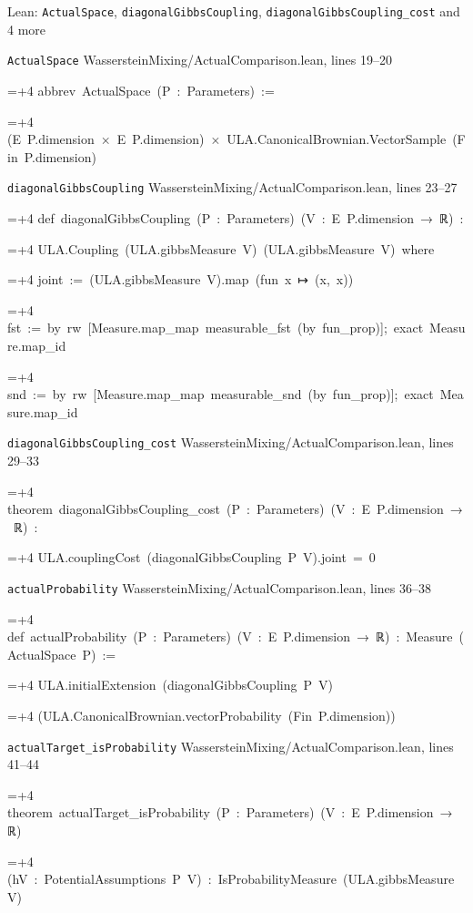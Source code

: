 \documentclass[11pt,a4paper]{report}
\newlength{\leancharwidth}
\newenvironment{leancode}{\par\smallskip\begingroup\ttfamily\footnotesize\raggedright
  \settowidth{\leancharwidth}{M}\setlength{\parskip}{0pt}\setlength{\parindent}{0pt}
  \frenchspacing}{\par\endgroup\smallskip}
\newcommand{\leanline}[2]{\hangindent=\dimexpr#1\leancharwidth+4\leancharwidth\relax
  \hangafter=1\noindent\hspace*{#1\leancharwidth}#2\par}
\newcommand{\leansource}[1]{\par{\footnotesize\color{leanmuted}#1}\par}
\begin{document}
\begin{leanbox}{Lean: \texttt{ActualSpace}, \texttt{diagonalGibbsCoupling}, \texttt{diagonalGibbsCoupling\_\allowbreak{}cost} and 4 more}
\leansource{\texttt{ActualSpace} \quad WassersteinMixing/\allowbreak{}ActualComparison.lean, lines 19–20}
\begin{leancode}
\leanline{0}{abbrev\ ActualSpace\ (P\ :\ Parameters)\ :=}
\leanline{2}{(E\ P.dimension\ ×\ E\ P.dimension)\ ×\ ULA.CanonicalBrownian.VectorSample\ (Fin\ P.dimension)}
\end{leancode}
\leansource{\texttt{diagonalGibbsCoupling} \quad WassersteinMixing/\allowbreak{}ActualComparison.lean, lines 23–27}
\begin{leancode}
\leanline{0}{def\ diagonalGibbsCoupling\ (P\ :\ Parameters)\ (V\ :\ E\ P.dimension\ →\ ℝ)\ :}
\leanline{4}{ULA.Coupling\ (ULA.gibbsMeasure\ V)\ (ULA.gibbsMeasure\ V)\ where}
\leanline{2}{joint\ :=\ (ULA.gibbsMeasure\ V).map\ (fun\ x\ ↦\ (x,\ x))}
\leanline{2}{fst\ :=\ by\ rw\ [Measure.map\_map\ measurable\_fst\ (by\ fun\_prop)];\ exact\ Measure.map\_id}
\leanline{2}{snd\ :=\ by\ rw\ [Measure.map\_map\ measurable\_snd\ (by\ fun\_prop)];\ exact\ Measure.map\_id}
\end{leancode}
\leansource{\texttt{diagonalGibbsCoupling\_\allowbreak{}cost} \quad WassersteinMixing/\allowbreak{}ActualComparison.lean, lines 29–33}
\begin{leancode}
\leanline{0}{theorem\ diagonalGibbsCoupling\_cost\ (P\ :\ Parameters)\ (V\ :\ E\ P.dimension\ →\ ℝ)\ :}
\leanline{4}{ULA.couplingCost\ (diagonalGibbsCoupling\ P\ V).joint\ =\ 0}
\end{leancode}
\leansource{\texttt{actualProbability} \quad WassersteinMixing/\allowbreak{}ActualComparison.lean, lines 36–38}
\begin{leancode}
\leanline{0}{def\ actualProbability\ (P\ :\ Parameters)\ (V\ :\ E\ P.dimension\ →\ ℝ)\ :\ Measure\ (ActualSpace\ P)\ :=}
\leanline{2}{ULA.initialExtension\ (diagonalGibbsCoupling\ P\ V)}
\leanline{4}{(ULA.CanonicalBrownian.vectorProbability\ (Fin\ P.dimension))}
\end{leancode}
\leansource{\texttt{actualTarget\_\allowbreak{}isProbability} \quad WassersteinMixing/\allowbreak{}ActualComparison.lean, lines 41–44}
\begin{leancode}
\leanline{0}{theorem\ actualTarget\_isProbability\ (P\ :\ Parameters)\ (V\ :\ E\ P.dimension\ →\ ℝ)}
\leanline{4}{(hV\ :\ PotentialAssumptions\ P\ V)\ :\ IsProbabilityMeasure\ (ULA.gibbsMeasure\ V)}
\end{leancode}

\end{leanbox}
\end{document}
